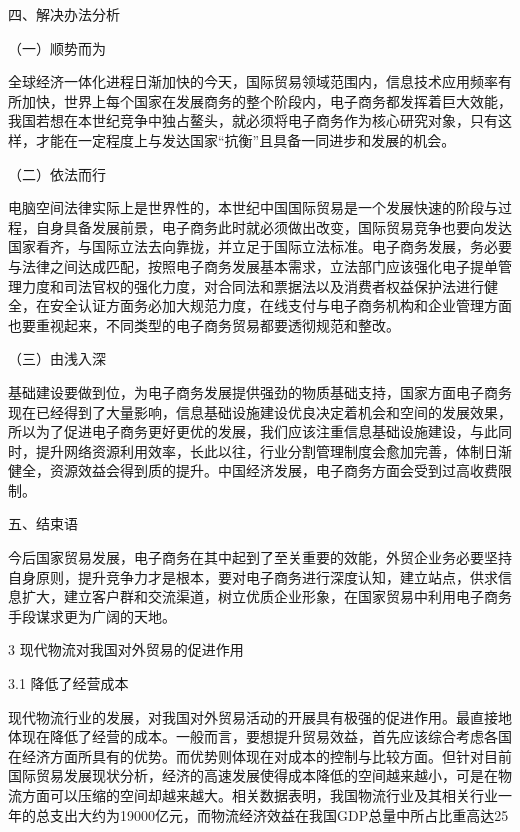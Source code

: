 四、解决办法分析

（一）顺势而为

全球经济一体化进程日渐加快的今天，国际贸易领域范围内，信息技术应用频率有所加快，世界上每个国家在发展商务的整个阶段内，电子商务都发挥着巨大效能，我国若想在本世纪竞争中独占鳌头，就必须将电子商务作为核心研究对象，只有这样，才能在一定程度上与发达国家“抗衡”且具备一同进步和发展的机会。

（二）依法而行

电脑空间法律实际上是世界性的，本世纪中国国际贸易是一个发展快速的阶段与过程，自身具备发展前景，电子商务此时就必须做出改变，国际贸易竞争也要向发达国家看齐，与国际立法去向靠拢，并立足于国际立法标准。电子商务发展，务必要与法律之间达成匹配，按照电子商务发展基本需求，立法部门应该强化电子提单管理力度和司法官权的强化力度，对合同法和票据法以及消费者权益保护法进行健全，在安全认证方面务必加大规范力度，在线支付与电子商务机构和企业管理方面也要重视起来，不同类型的电子商务贸易都要透彻规范和整改。

（三）由浅入深

基础建设要做到位，为电子商务发展提供强劲的物质基础支持，国家方面电子商务现在已经得到了大量影响，信息基础设施建设优良决定着机会和空间的发展效果，所以为了促进电子商务更好更优的发展，我们应该注重信息基础设施建设，与此同时，提升网络资源利用效率，长此以往，行业分割管理制度会愈加完善，体制日渐健全，资源效益会得到质的提升。中国经济发展，电子商务方面会受到过高收费限制。

五、结束语

今后国家贸易发展，电子商务在其中起到了至关重要的效能，外贸企业务必要坚持自身原则，提升竞争力才是根本，要对电子商务进行深度认知，建立站点，供求信息扩大，建立客户群和交流渠道，树立优质企业形象，在国家贸易中利用电子商务手段谋求更为广阔的天地。 



 
 
 

3 现代物流对我国对外贸易的促进作用

3.1 降低了经营成本

现代物流行业的发展，对我国对外贸易活动的开展具有极强的促进作用。最直接地体现在降低了经营的成本。一般而言，要想提升贸易效益，首先应该综合考虑各国在经济方面所具有的优势。而优势则体现在对成本的控制与比较方面。但针对目前国际贸易发展现状分析，经济的高速发展使得成本降低的空间越来越小，可是在物流方面可以压缩的空间却越来越大。相关数据表明，我国物流行业及其相关行业一年的总支出大约为19000亿元，而物流经济效益在我国GDP总量中所占比重高达25%

